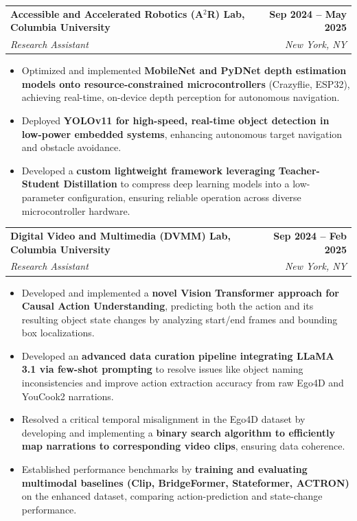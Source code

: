 \documentclass[letterpaper,11pt]{article}
\makeatletter
\newcommand{\resumeItem}[1]{
  \item\small{
    {#1 \vspace{-2pt}}
  }
}
\newcommand{\resumeSubheading}[4]{
  \vspace{-2pt}\item
    \begin{tabular*}{1.0\textwidth}[t]{l@{\extracolsep{\fill}}r}
      \textbf{#1} & \textbf{\small #2} \\
      \textit{\small#3} & \textit{\small #4} \\
    \end{tabular*}\vspace{-7pt}
}
\newcommand{\resumeItemListStart}{\begin{itemize}}
\newcommand{\resumeItemListEnd}{\end{itemize}\vspace{-5pt}}
\makeatother
\begin{document}
\resumeSubheading
{Accessible and Accelerated Robotics (A$^2$R) Lab, Columbia University}{Sep 2024 -- May 2025}
{Research Assistant}{New York, NY}
\resumeItemListStart
\resumeItem{Optimized and implemented \textbf{MobileNet and PyDNet depth estimation models onto resource-constrained microcontrollers} (Crazyflie, ESP32), achieving real-time, on-device depth perception for autonomous navigation.}
\resumeItem{Deployed \textbf{YOLOv11 for high-speed, real-time object detection in low-power embedded systems}, enhancing autonomous target navigation and obstacle avoidance.}
\resumeItem{Developed a \textbf{custom lightweight framework leveraging Teacher-Student Distillation} to compress deep learning models into a low-parameter configuration, ensuring reliable operation across diverse microcontroller hardware.}
\resumeItemListEnd

\resumeSubheading
{Digital Video and Multimedia (DVMM) Lab, Columbia University}{Sep 2024 -- Feb 2025}
{Research Assistant}{New York, NY}
\resumeItemListStart
\resumeItem{Developed and implemented a \textbf{novel Vision Transformer approach for Causal Action Understanding}, predicting both the action and its resulting object state changes by analyzing start/end frames and bounding box localizations.}
\resumeItem{Developed an \textbf{advanced data curation pipeline integrating LLaMA 3.1 via few-shot prompting} to resolve issues like object naming inconsistencies and improve action extraction accuracy from raw Ego4D and YouCook2 narrations.}
\resumeItem{Resolved a critical temporal misalignment in the Ego4D dataset by developing and implementing a \textbf{binary search algorithm to efficiently map narrations to corresponding video clips}, ensuring data coherence.}
\resumeItem{Established performance benchmarks by \textbf{training and evaluating multimodal baselines (Clip, BridgeFormer, Stateformer, ACTRON)} on the enhanced dataset, comparing action-prediction and state-change performance.}
\resumeItemListEnd

\end{document}
